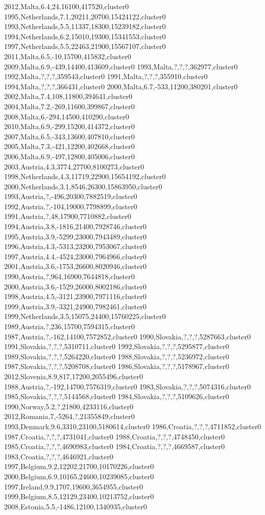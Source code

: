 2012,Malta,6.4,24,16100,417520,cluster0
1995,Netherlands,7.1,20211,20700,15424122,cluster0
1993,Netherlands,5.5,11337,18300,15239182,cluster0
1994,Netherlands,6.2,15010,19300,15341553,cluster0
1997,Netherlands,5.5,22463,21900,15567107,cluster0
2011,Malta,6.5,-10,15700,415832,cluster0
2009,Malta,6.9,-439,14400,413609,cluster0
1993,Malta,?,?,?,362977,cluster0
1992,Malta,?,?,?,359543,cluster0
1991,Malta,?,?,?,355910,cluster0
1994,Malta,?,?,?,366431,cluster0
2000,Malta,6.7,-533,11200,380201,cluster0
2002,Malta,7.4,108,11800,394641,cluster0
2004,Malta,7.2,-269,11600,399867,cluster0
2008,Malta,6,-294,14500,410290,cluster0
2010,Malta,6.9,-299,15200,414372,cluster0
2007,Malta,6.5,-343,13600,407810,cluster0
2005,Malta,7.3,-421,12200,402668,cluster0
2006,Malta,6.9,-497,12800,405006,cluster0
2003,Austria,4.3,3774,27700,8100273,cluster0
1998,Netherlands,4.3,11719,22900,15654192,cluster0
2000,Netherlands,3.1,8546,26300,15863950,cluster0
1993,Austria,?,-496,20300,7882519,cluster0
1992,Austria,?,-104,19000,7798899,cluster0
1991,Austria,?,48,17900,7710882,cluster0
1994,Austria,3.8,-1816,21400,7928746,cluster0
1995,Austria,3.9,-5299,23000,7943489,cluster0
1996,Austria,4.3,-5313,23200,7953067,cluster0
1997,Austria,4.4,-4524,23000,7964966,cluster0
2001,Austria,3.6,-1753,26600,8020946,cluster0
1990,Austria,?,964,16900,7644818,cluster0
2000,Austria,3.6,-1529,26000,8002186,cluster0
1998,Austria,4.5,-3121,23900,7971116,cluster0
1999,Austria,3.9,-3321,24900,7982461,cluster0
1999,Netherlands,3.5,15075,24400,15760225,cluster0
1989,Austria,?,236,15700,7594315,cluster0
1987,Austria,?,-162,14100,7572852,cluster0
1990,Slovakia,?,?,?,5287663,cluster0
1991,Slovakia,?,?,?,5310711,cluster0
1992,Slovakia,?,?,?,5295877,cluster0
1989,Slovakia,?,?,?,5264220,cluster0
1988,Slovakia,?,?,?,5236972,cluster0
1987,Slovakia,?,?,?,5208708,cluster0
1986,Slovakia,?,?,?,5178967,cluster0
2012,Slovenia,8.9,817,17200,2055496,cluster0
1988,Austria,?,-192,14700,7576319,cluster0
1983,Slovakia,?,?,?,5074316,cluster0
1985,Slovakia,?,?,?,5144568,cluster0
1984,Slovakia,?,?,?,5109626,cluster0
1990,Norway,5.2,?,21800,4233116,cluster0
2012,Romania,7,-5264,?,21355849,cluster0
1993,Denmark,9.6,3310,23100,5180614,cluster0
1986,Croatia,?,?,?,4711852,cluster0
1987,Croatia,?,?,?,4731041,cluster0
1988,Croatia,?,?,?,4748450,cluster0
1985,Croatia,?,?,?,4690983,cluster0
1984,Croatia,?,?,?,4669587,cluster0
1983,Croatia,?,?,?,4646921,cluster0
1997,Belgium,9.2,12202,21700,10170226,cluster0
2000,Belgium,6.9,10165,24600,10239085,cluster0
1997,Ireland,9.9,1707,19600,3654955,cluster0
1999,Belgium,8.5,12129,23400,10213752,cluster0
2008,Estonia,5.5,-1486,12100,1340935,cluster0
